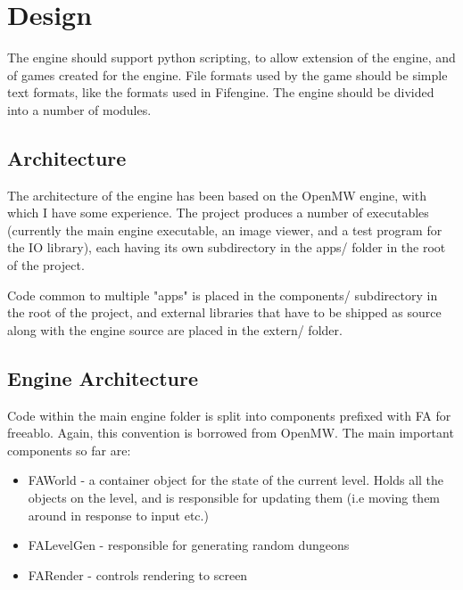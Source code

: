   \chapter{Design}
    The engine should support python scripting, to allow extension of the engine, and of games created for the engine.
    File formats used by the game should be simple text formats, like the formats used in Fifengine.
    The engine should be divided into a number of modules.
    
    \section{Architecture}
    The architecture of the engine has been based on the OpenMW\cite{openmw} engine, with which I have some experience.
    The project produces a number of executables (currently the main engine executable, an image viewer, and a test program for the IO library), each having its own subdirectory in the apps/ folder in the root of the project.
    
    Code common to multiple "apps" is placed in the components/ subdirectory in the root of the project, and external libraries that have to be shipped as source along with the engine source are placed in the extern/ folder.
    
    \section{Engine Architecture}
    Code within the main engine folder is split into components prefixed with FA for freeablo. Again, this convention is borrowed from OpenMW\cite{openmw}.
    The main important components so far are:
    \begin{itemize}
        \item{FAWorld - a container object for the state of the current level. Holds all the objects on the level, and is responsible for updating them (i.e moving them around in response to input etc.)}
        \item{FALevelGen - responsible for generating random dungeons}
        \item{FARender - controls rendering to screen}
    \end{itemize}

